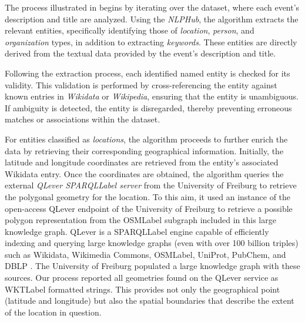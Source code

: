  The process illustrated in  begins by iterating over the dataset, where each event's description and title are analyzed. Using the \textit{NLPHub}\cite{coro2021nlphub}, the algorithm extracts the relevant entities, specifically identifying those of \emph{location}, \emph{person}, and \emph{organization} types, in addition to extracting \emph{keywords}. These entities are directly derived from the textual data provided by the event's description and title.

Following the extraction process, each identified named entity is checked for its validity. This validation is performed by cross-referencing the entity against known entries in \textit{Wikidata} or \textit{Wikipedia}, ensuring that the entity is unambiguous. If ambiguity is detected, the entity is disregarded, thereby preventing erroneous matches or associations within the dataset.

For entities classified as \emph{locations}, the algorithm proceeds to further enrich the data by retrieving their corresponding geographical information. Initially, the latitude and longitude coordinates are retrieved from the entity's associated Wikidata entry. Once the coordinates are obtained, the algorithm queries the external \textit{QLever \acrshort{SPARQLLabel} server} from the University of Freiburg to retrieve the polygonal geometry for the location. To this aim, it used an instance of the open-access QLever endpoint of the University of Freiburg \cite{qleverinstance2024} to retrieve a possible polygon representation from the \acrshort{OSMLabel} subgraph included in this large knowledge graph. QLever is a \acrshort{SPARQLLabel} engine capable of efficiently indexing and querying large knowledge graphs (even with over 100 billion triples) such as Wikidata, Wikimedia Commons, \acrshort{OSMLabel}, UniProt, PubChem, and DBLP \cite{bast2017qlever}. The University of Freiburg populated a large knowledge graph with these sources. Our process reported all geometries found on the QLever service as \acrshort{WKTLabel} formatted strings\cite{WellknownTextRepresentationa}. This provides not only the geographical point (latitude and longitude) but also the spatial boundaries that describe the extent of the location in question.



